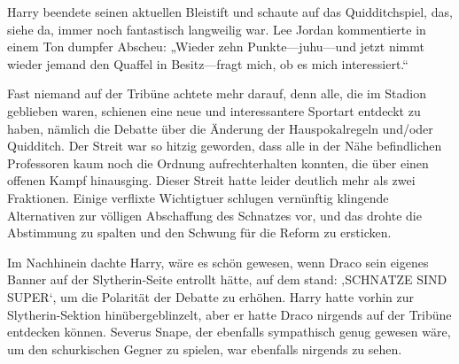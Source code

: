 Harry beendete seinen aktuellen Bleistift und schaute auf das Quidditchspiel, das, siehe da, immer noch fantastisch langweilig war.
Lee Jordan kommentierte in einem Ton dumpfer Abscheu: „Wieder zehn Punkte—juhu—und jetzt nimmt wieder jemand den Quaffel in Besitz—fragt mich, ob es mich interessiert.“

Fast niemand auf der Tribüne achtete mehr darauf, denn alle, die im Stadion geblieben waren, schienen eine neue und interessantere Sportart entdeckt zu haben, nämlich die Debatte über die Änderung der Hauspokalregeln und/oder Quidditch.
Der Streit war so hitzig geworden, dass alle in der Nähe befindlichen Professoren kaum noch die Ordnung aufrechterhalten konnten, die über einen offenen Kampf hinausging. Dieser Streit hatte leider deutlich mehr als zwei Fraktionen. Einige verflixte Wichtigtuer schlugen vernünftig klingende Alternativen zur völligen Abschaffung des Schnatzes vor, und das drohte die Abstimmung zu spalten und den Schwung für die Reform zu ersticken.

Im Nachhinein dachte Harry, wäre es schön gewesen, wenn Draco sein eigenes Banner auf der Slytherin-Seite entrollt hätte, auf dem stand:
‚SCHNATZE SIND SUPER‘, um die Polarität der Debatte zu erhöhen.
Harry hatte vorhin zur Slytherin-Sektion hinübergeblinzelt, aber er hatte Draco nirgends auf der Tribüne entdecken können. Severus Snape, der ebenfalls sympathisch genug gewesen wäre, um den schurkischen Gegner zu spielen, war ebenfalls nirgends zu sehen.

